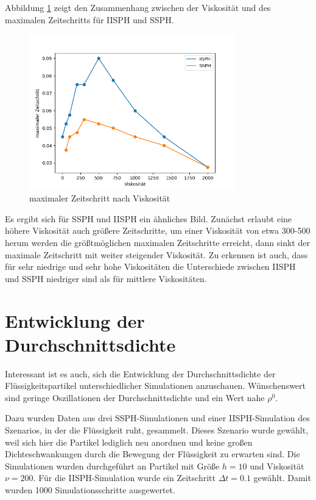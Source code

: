 \documentclass{scrreprt}
\begin{document}
Abbildung \ref{image:viscosity_timestep} zeigt den Zusammenhang zwischen der Viskosität und des maximalen Zeitschritts für IISPH und SSPH.

\begin{figure}[htb]
    \includegraphics[width=0.8\textwidth]{viscosity_timestep.png}
    \caption{maximaler Zeitschritt nach Viskosität}
    \label{image:viscosity_timestep}
\end{figure}

Es ergibt sich für SSPH und IISPH ein ähnliches Bild.
Zunächst erlaubt eine höhere Viskosität auch größere Zeitschritte, um einer Viskosität von etwa 300-500 herum werden die größtmöglichen maximalen Zeitschritte erreicht,
dann sinkt der maximale Zeitschritt mit weiter steigender Viskosität.
Zu erkennen ist auch, dass für sehr niedrige und sehr hohe Viskositäten die Unterschiede zwischen IISPH und SSPH niedriger sind als für mittlere Viskositäten.


\section{Entwicklung der Durchschnittsdichte}
Interessant ist es auch, sich die Entwicklung der Durchschnittsdichte der Flüssigkeitspartikel unterschiedlicher Simulationen anzuschauen.
Wünschenswert sind geringe Oszillationen der Durchschnittsdichte und ein Wert nahe $\rho^0$.

Dazu wurden Daten aus drei SSPH-Simulationen und einer IISPH-Simulation des Szenarios, in der die Flüssigkeit ruht, gesammelt.
Dieses Szenario wurde gewählt, weil sich hier die Partikel lediglich neu anordnen und keine großen Dichteschwankungen durch die Bewegung der Flüssigkeit zu erwarten sind.
Die Simulationen wurden durchgeführt an Partikel mit Größe $h=10$ und Viskosität $\nu = 200$.
Für die IISPH-Simulation wurde ein Zeitschritt $\Delta t = 0.1$ gewählt.
Damit wurden 1000 Simulationsschritte ausgewertet.
\end{document}
